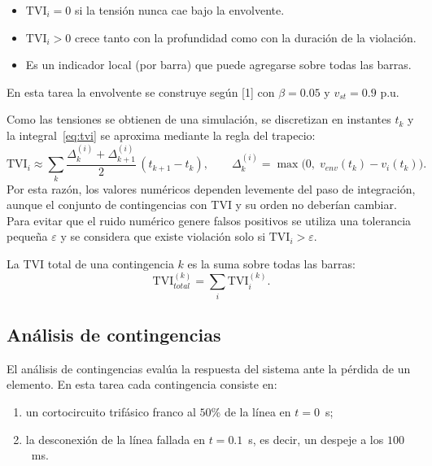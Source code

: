\begin{itemize}
    \item $\mathrm{TVI}_i = 0$ si la tensión nunca cae bajo la envolvente.
    \item $\mathrm{TVI}_i > 0$ crece tanto con la profundidad como con la duración de la violación.
    \item Es un indicador local (por barra) que puede agregarse sobre todas las barras.
\end{itemize}

En esta tarea la envolvente se construye según [1] con $\beta = 0.05$ y $v_{st} = 0.9$ p.u.

Como las tensiones se obtienen de una simulación, se discretizan en instantes $t_k$ y la integral~\eqref{eq:tvi} se aproxima mediante la regla del trapecio:
\begin{equation}
    \mathrm{TVI}_i \approx \sum_{k} \frac{\Delta_k^{(i)} + \Delta_{k+1}^{(i)}}{2}\,(t_{k+1}-t_k),
    \qquad
    \Delta_k^{(i)} = \max\!\big(0,\; v_{env}(t_k) - v_i(t_k)\big).
\end{equation}
Por esta razón, los valores numéricos dependen levemente del paso de integración, aunque el conjunto de contingencias con TVI y su orden no deberían cambiar. Para evitar que el ruido numérico genere falsos positivos se utiliza una tolerancia pequeña $\varepsilon$ y se considera que existe violación solo si $\mathrm{TVI}_i > \varepsilon$.

La TVI total de una contingencia $k$ es la suma sobre todas las barras:
\begin{equation}
    \mathrm{TVI}_{total}^{(k)} = \sum_{i} \mathrm{TVI}_i^{(k)}.
\end{equation}

\subsection{Análisis de contingencias}

El análisis de contingencias evalúa la respuesta del sistema ante la pérdida de un elemento. En esta tarea cada contingencia consiste en:

\begin{enumerate}
    \item un cortocircuito trifásico franco al $50$\% de la línea en $t = 0$~s;
    \item la desconexión de la línea fallada en $t = 0.1$~s, es decir, un despeje a los $100$~ms.
\end{enumerate}

